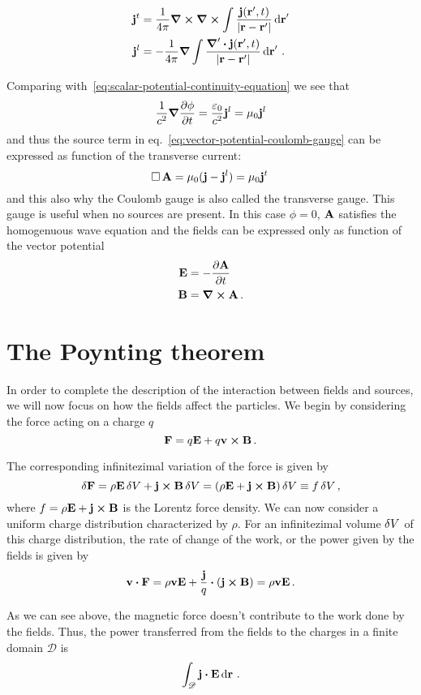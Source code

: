 \documentclass[12pt, class=report, crop=false]{standalone}
\begin{document}
\begin{align*}
  \vb{j}^t &= \frac{1}{4\pi} \curl \curl \int \frac{\vb{j}(\vb{r}',t)}{|\vb{r}-\vb{r}'|} \dd{\vb{r}}' \\
  \vb{j}^l &= -\frac{1}{4\pi} \grad \int
    \frac{\boldsymbol{\nabla}' \vdot \vb{j}(\vb{r}',t)}{|\vb{r}-\vb{r}'|} \dd{\vb{r}}'\,.
\end{align*}

Comparing with~\eqref{eq:scalar-potential-continuity-equation} we see that
\[
  \frac{1}{c^2} \grad{\pdv{\phi}{t}} = \frac{\varepsilon_0}{c^2} \vb{j}^l
  = \mu_0 \vb{j}^l
\]
and thus the source term in eq.~\eqref{eq:vector-potential-coulomb-gauge} can
be expressed as function of the transverse current:
\[
  \operatorname{\Box} \vb{A} = \mu_0 (\vb{j} - \vb{j}^l) = \mu_0 \vb{j}^t\,
\]
and this also why the Coulomb gauge is also called the transverse gauge.
This gauge is useful when no sources are present. In this case \(\phi=0\),
\(\vb{A}\) satisfies the homogenuous wave equation and the fields can
be expressed only as function of the vector potential
\begin{align*}
  \vb{E} &= -\pdv{\vb{A}}{t} \\
  \vb{B} &= \curl{\vb{A}}\,.
\end{align*}

\section{The Poynting theorem}

In order to complete the description of the interaction between fields
and sources, we will now focus on how the fields affect the particles.
We begin by considering the force acting on a charge \(q\)
\[
  \vb{F} = q\vb{E} + q\vb{v} \cp \vb{B}\,.
\]

The corresponding infinitezimal variation of the force is given by
\[
  \var{\vb{F}} = \rho \vb{E} \var{V} + \vb{j} \cp \vb{B} \var{V}
    = (\rho \vb{E} + \vb{j} \cp \vb{B}) \var{V}
    \equiv f \var{V},
\]
where \(f = \rho \vb{E} + \vb{j} \cp \vb{B}\) is the Lorentz force
density. We can now consider a uniform charge distribution characterized
by \(\rho\). For an infinitezimal volume \(\var{V}\) of this charge distribution,
the rate of change of the work, or the power given by the
fields is given by
\[
  \vb{v} \vdot \vb{F} = \rho \vb{v} \vb{E} + \frac{\vb{j}}{q} \vdot (\vb{j} \cp \vb{B})
    = \rho \vb{v} \vb{E}\,.
\]

As we can see above, the magnetic force doesn't contribute to the work
done by the fields. Thus, the power transferred from the fields to the
charges in a finite domain \(\mathscr{D}\) is
\[
  \int_{\mathscr{D}} \vb{j} \vdot \vb{E} \dd{\vb{r}}\,.
\]
\end{document}
